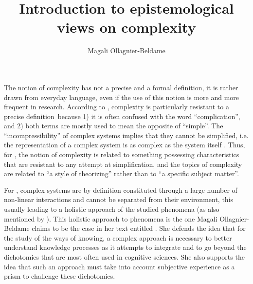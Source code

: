 \documentclass[output=paper]{langscibook}
\author{Magali Ollagnier-Beldame\affiliation{UMR 5161 ICAR; Centre National de la Recherche Scientifique; Ecole Normale Supérieure; Université Lumière Lyon 2}}
\title{Introduction to epistemological views on complexity}
\begin{document}
\maketitle 

\noindent The notion of complexity has not a precise and a formal definition, it is rather drawn from everyday language, even if the use of this notion is more and more frequent in research. According to \citet{Israel2005}, complexity is particularly resistant to a precise definition~because 1) it is often confused with the word “complication”, and 2) both terms are mostly used to mean the opposite of “simple”. The “incompressibility” of complex systems implies that they cannot be simplified, i.e. the representation of a complex system is as complex as the system itself \citep{Partanen2015}. Thus, for \textcite{Israel2005}, the notion of complexity is related to something possessing characteristics that are resistant to any attempt at simplification, and the topics of complexity are related to “a style of theorizing” rather than to “a specific subject matter”.

For \textcite{Partanen2015}, complex systems are by definition constituted through a large number of non-linear interactions and cannot be separated from their environment, this usually leading to a holistic approach of the studied phenomena (as also mentioned by \citeauthor{Israel2005}). This holistic approach to phenomena is the one Magali Ollagnier-Beldame claims to be the case in her text entitled . She defends the idea that for the study of the ways of knowing, a complex approach is necessary to better understand knowledge processes as it attempts to integrate and to go beyond the dichotomies that are most often used in cognitive sciences. She also supports the idea that such an approach must take into account subjective experience as a prism to challenge these dichotomies.
\end{document}
